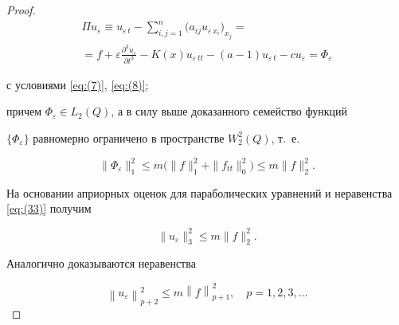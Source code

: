\begin{proof}
\begin{multline}
\label{eq:(32)}

\Pi u_ \varepsilon  \equiv u _{\varepsilon\,t} - 

\sum\limits_{i,j=1}^{n} \bigl( a_{ij} u_{\varepsilon \, x_i} \bigr) _{ x_j} 

=

\\

=

f+\varepsilon  \frac{\partial ^3  u_\varepsilon }{\partial t ^3}- 

K(x) u_{\varepsilon \, tt}

 -(a-1)u_{\varepsilon \,t} -c  u _{\varepsilon }=

 \Phi _{\varepsilon } 

\end{multline}

с условиями \eqref{eq:(7)}, \eqref{eq:(8)};

причем  ${{\Phi}_{\varepsilon }}\in {{L}_{2}}(Q)$, а в силу выше доказанного семейство функций  

$\{ \Phi_\varepsilon \}$ равномерно ограничено в пространстве $W_{2}^{2}(Q)$, т.~е.

\begin{equation}

\label{eq:(33)}

\| \Phi_\varepsilon \|_{1}^{2}\le m\bigl( \| f \|_{1}^{2}+\| f_{tt}\|_{0}^{2} \bigr)\le m\| f \|_{2}^{2}.

\end{equation}

На основании априорных оценок для параболических уравнений \cite{dzhamalov:10} и неравенства \eqref{eq:(33)} получим

$$

\| u_\varepsilon \|_{3}^{2}\le m \| f \|_{2}^{2}.

$$

Аналогично доказываются неравенства

$$

\left\| {{u}_{\varepsilon }} \right\|_{p+2}^{2}\le m\left\| f \right\|_{p+1}^{2}, \quad  p=1,2,3,\dots

$$



\vspace{-1.5em}



\hfill \end{proof}





